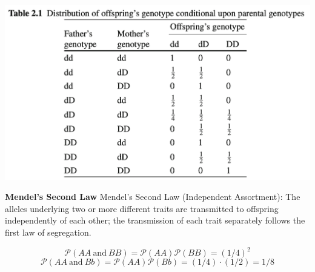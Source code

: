\documentclass[a4paper,twoside,11pt]{article}
\begin{document}
\begin{center}
\includegraphics[scale=0.5]{figure6.png}
\end{center}
\begin{shaded*}
\noindent \textbf{Mendel's Second Law}
\newline
\noindent Mendel’s Second Law (Independent Assortment): The alleles underlying two or
more different traits are transmitted to offspring independently of each other; the transmission of each trait separately follows the first law of segregation.
\end{shaded*}
$$
\mathcal{P}(AA \ \text{and} \ BB) = \mathcal{P}(AA) \mathcal{P}(BB) = (1/4)^2
$$
$$
\mathcal{P}(AA \ \text{and} \ Bb) = \mathcal{P}(AA) \mathcal{P}(Bb) = (1/4) \cdot (1/2) = 1/8
$$
\end{document}
